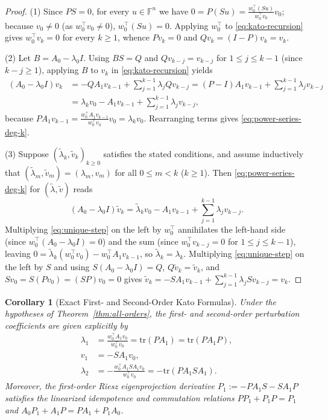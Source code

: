 \documentclass[11pt,a4paper]{article}
\newtheorem{corollary}[theorem]{Corollary}
\theoremstyle{definition}
\newcommand{\tr}{\mathrm{tr}}
\begin{document}
\begin{proof}
(1) Since $P S = 0$, for every $u \in \mathbb{F}^n$ we have
$0 = P(S u) = \frac{w_0^\top (S u)}{w_0^\top v_0} v_0$; because $v_0 \neq 0$ (as
$w_0^\top v_0 \neq 0$), $w_0^\top (S u) = 0$. Applying $w_0^\top$ to
\eqref{eq:kato-recursion} gives $w_0^\top v_k = 0$ for every $k \ge 1$, whence
$P v_k = 0$ and $Q v_k = (I - P) v_k = v_k$.

(2) Let $B = A_0 - \lambda_0 I$. Using $B S = Q$ and $Q v_{k-j} = v_{k-j}$ for
$1 \le j \le k - 1$ (since $k - j \ge 1$), applying $B$ to $v_k$ in
\eqref{eq:kato-recursion} yields
\begin{align*}
  (A_0 - \lambda_0 I) v_k
  &= - Q A_1 v_{k-1} + \sum_{j=1}^{k-1} \lambda_j Q v_{k-j}
   = (P - I) A_1 v_{k-1} + \sum_{j=1}^{k-1} \lambda_j v_{k-j} \\
  &= \lambda_k v_0 - A_1 v_{k-1} + \sum_{j=1}^{k-1} \lambda_j v_{k-j},
\end{align*}
because $P A_1 v_{k-1} = \frac{w_0^\top A_1 v_{k-1}}{w_0^\top v_0} v_0 = \lambda_k v_0$.
Rearranging terms gives \eqref{eq:power-series-deg-k}.

(3) Suppose $(\tilde{\lambda}_k, \tilde{v}_k)_{k \ge 0}$ satisfies the stated
conditions, and assume inductively that $(\tilde{\lambda}_m, \tilde{v}_m) =
(\lambda_m, v_m)$ for all $0 \le m < k$ ($k \ge 1$). Then \eqref{eq:power-series-deg-k}
for $(\tilde{\lambda}, \tilde{v})$ reads
\begin{equation}\label{eq:unique-step}
  (A_0 - \lambda_0 I) \tilde{v}_k
  = \tilde{\lambda}_k v_0 - A_1 v_{k-1} + \sum_{j=1}^{k-1} \lambda_j v_{k-j}.
\end{equation}
Multiplying \eqref{eq:unique-step} on the left by $w_0^\top$ annihilates the left-hand
side (since $w_0^\top(A_0 - \lambda_0 I) = 0$) and the sum (since $w_0^\top v_{k-j} = 0$
for $1 \le j \le k - 1$), leaving $0 = \tilde{\lambda}_k (w_0^\top v_0) -
w_0^\top A_1 v_{k-1}$, so $\tilde{\lambda}_k = \lambda_k$. Multiplying
\eqref{eq:unique-step} on the left by $S$ and using $S(A_0 - \lambda_0 I) = Q$,
$Q \tilde{v}_k = \tilde{v}_k$, and $S v_0 = S(P v_0) = (SP) v_0 = 0$ gives
$\tilde{v}_k = - S A_1 v_{k-1} + \sum_{j=1}^{k-1} \lambda_j S v_{k-j} = v_k$.
\end{proof}

\begin{corollary}[Exact First- and Second-Order Kato Formulas]\label{cor:kato-formulas}
Under the hypotheses of Theorem~\ref{thm:all-orders}, the first- and second-order
perturbation coefficients are given explicitly by
\begin{align}
  \lambda_1 &= \frac{w_0^\top A_1 v_0}{w_0^\top v_0}
             = \tr(P A_1) = \tr(P A_1 P), \label{eq:lam1}\\
  v_1 &= - S A_1 v_0, \label{eq:v1}\\
  \lambda_2 &= -\frac{w_0^\top A_1 S A_1 v_0}{w_0^\top v_0}
             = -\tr(P A_1 S A_1). \label{eq:lam2}
\end{align}
Moreover, the first-order Riesz eigenprojection derivative
$P_1 := - P A_1 S - S A_1 P$ satisfies the linearized idempotence and commutation
relations $P P_1 + P_1 P = P_1$ and $A_0 P_1 + A_1 P = P A_1 + P_1 A_0$.
\end{corollary}
\end{document}
